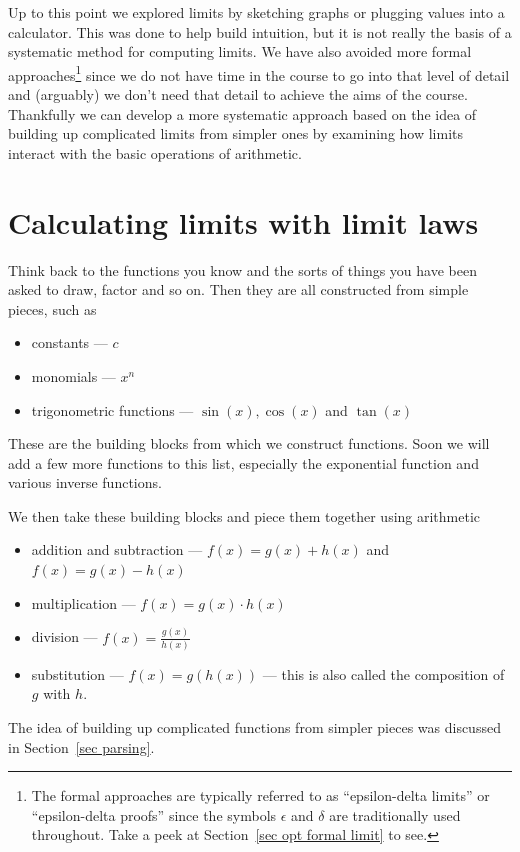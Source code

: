 Up to this point we explored limits by sketching graphs or plugging values into
a calculator. This was done to help build intuition, but it is not really the
basis of a systematic method for computing limits. We have also avoided more
formal approaches\footnote{The formal
approaches are typically referred to as ``epsilon-delta limits'' or
``epsilon-delta proofs'' since the symbols $\epsilon$ and $\delta$ are
traditionally used throughout. Take a peek at Section~\ref{sec opt
formal limit} to see.} since we do not have time in the course to go into
that level of detail and (arguably) we don't need that detail to achieve the
aims of the course. Thankfully we can develop a more systematic approach based
on the idea of building up complicated limits from simpler ones by examining how
limits interact with the basic operations of arithmetic.

\section{Calculating limits with limit laws}
Think back to the functions you know and the sorts of things you have  been
asked to draw, factor and so on. Then they are all constructed from simple
pieces, such as
\begin{itemize}
 \item constants --- $c$
 \item monomials --- $x^n$
 \item trigonometric functions --- $\sin(x), \cos(x)$ and $\tan(x)$
\end{itemize}
These are the building blocks from which we construct functions. Soon we will
add a few more functions to this list, especially the exponential function and
various inverse functions.

We then take these building blocks and piece them together using arithmetic
\begin{itemize}
 \item addition and subtraction --- $f(x)  = g(x) + h(x)$ and $f(x) = g(x) -
h(x)$
 \item multiplication --- $f(x) = g(x) \cdot h(x)$
 \item division --- $f(x) = \frac{g(x)}{h(x)}$
 \item substitution --- $f(x) = g( h(x) )$ --- this is also called
the composition of $g$ with $h$.
\end{itemize}
The idea of building up complicated functions from simpler pieces was discussed
in Section~\ref{sec parsing}.

